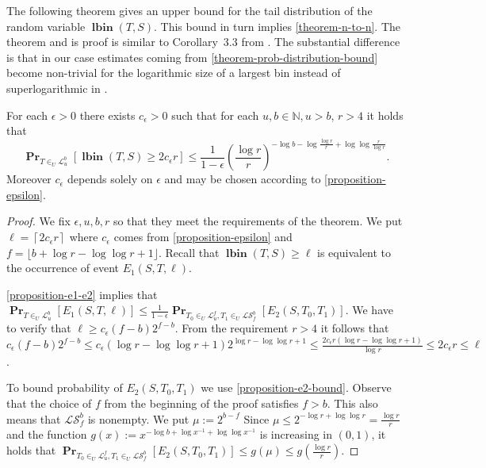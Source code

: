 \documentclass[unicode,review]{siamart1116}
\newcommand{\lbin}[2]{\operatorname{\mathbf{lbin}}({#1}, {#2})}
\newcommand{\linearmaps}[2]{\mathcal{L}_{#1}^{#2}}
\newcommand{\surjectivelinearmaps}[2]{\mathcal{LS}_{#1}^{#2}}
\newcommand{\probs}[2]{\operatorname{\mathbf{Pr}}_{{#1}}\left[{#2}\right]}
\numberwithin{theorem}{section}
\begin{document}
The following theorem gives an upper bound for the tail distribution of the random variable $\lbin{T}{S}$.
This bound in turn implies \cref{theorem-n-to-n}.
The theorem and is proof is similar to Corollary~3.3 from \cite{alonetal}.
The substantial difference is that in our case estimates coming from \cref{theorem-prob-distribution-bound} become non-trivial for the logarithmic size of a largest bin instead of superlogarithmic in \cite{alonetal}.

\begin{theorem}
\label{theorem-prob-distribution-bound}
For each $\epsilon > 0$ there exists $c_\epsilon > 0$ such that for each $u, b \in \mathbb{N}, u > b$, $r > 4$ it holds that
\[
\probs{T \in_U \linearmaps{u}{b}}{\lbin{T}{S} \geq 2 c_\epsilon r} \leq \frac{1}{1 - \epsilon}\left(\frac{\log r}{r}\right)^{-\log b - \log \frac{\log r}{r} + \log \log \frac{r}{\log r}}.
\]
Moreover $c_\epsilon$ depends solely on $\epsilon$ and may be chosen according to \cref{proposition-epsilon}.
\end{theorem}
\begin{proof}
We fix $\epsilon, u, b, r$ so that they meet the requirements of the theorem.
We put $\ell = \left \lceil 2c_\epsilon r \right\rceil$ where $c_\epsilon$ comes from \cref{proposition-epsilon} and $f = \lfloor b + \log r - \log \log r + 1 \rfloor$.
Recall that $\lbin{T}{S} \geq \ell$ is equivalent to the occurrence of event $E_1(S, T, \ell)$.

\cref{proposition-e1-e2} implies that $\probs{T \in_U \linearmaps{u}{b}}{E_1(S, T, \ell)} \leq \frac{1}{1 - \epsilon}\probs{T_0 \in_U \linearmaps{u}{f}, T_1 \in_U \surjectivelinearmaps{f}{b}}{E_2(S, T_0, T_1)}$.
We have to verify that $\ell \geq c_\epsilon (f - b)2^{f - b}$.
From the requirement $r > 4$ it follows that $c_\epsilon(f - b)2^{f - b} \leq c_\epsilon(\log r - \log \log r + 1)2^{\log r - \log \log r + 1} \leq \frac{2c_\epsilon r(\log r - \log \log r + 1)}{\log r} \leq 2c_\epsilon r \leq \ell$.

To bound probability of $E_2(S, T_0, T_1)$ we use \cref{proposition-e2-bound}.
Observe that the choice of $f$ from the beginning of the proof satisfies $f > b$.
This also means that $\surjectivelinearmaps{f}{b}$ is nonempty. 
We put $\mu := 2^{b - f}$
Since $\mu \leq 2^{-\log r + \log \log r} = \frac{\log r}{r}$ and the function $g(x) := x ^ {- \log b + \log x^{-1} + \log \log x^{-1}}$ is increasing in $(0, 1)$, it holds that $\probs{T_0 \in_U \linearmaps{u}{f}, T_1 \in_U \surjectivelinearmaps{f}{b}}{E_2(S, T_0, T_1)} \leq g(\mu) \leq g\left(\frac{\log r}{r}\right)$.
\end{proof}
\end{document}
